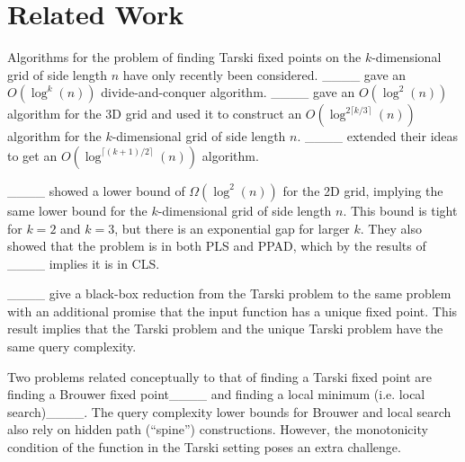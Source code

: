 \section{Related Work}
\label{sec:related_work}

Algorithms for the problem of finding Tarski fixed points on the $k$-dimensional grid of side length $n$ have only recently been considered. ____ gave an $O(\log^k (n))$ divide-and-conquer algorithm. ____ gave an $O(\log^2 (n))$ algorithm for the 3D grid and used it to construct an $O(\log^{2 \lceil k/3 \rceil} (n))$ algorithm for the $k$-dimensional grid of side length $n$. ____ extended their ideas to get an $O(\log^{\lceil (k+1)/2 \rceil}(n))$ algorithm.

 ____ showed a lower bound of $\Omega(\log^2(n))$ for the 2D grid, implying the same lower bound for the $k$-dimensional grid of side length $n$. This bound is tight for $k = 2$ and $k=3$, but there is an exponential gap for larger $k$. They also showed that the problem is in both PLS and PPAD, which by the results of ____ implies it is in CLS.

____ give a black-box reduction from the Tarski problem to the same problem with an additional promise that the input function has a unique fixed point. This result  implies that the Tarski problem and the unique Tarski problem have the same query complexity.

Two problems related conceptually to that of finding a Tarski fixed point are finding a Brouwer fixed point____ and finding a local minimum (i.e. local search)____. The query complexity lower bounds for Brouwer and local search also rely on hidden path (``spine'') constructions. However, the monotonicity condition of the function in the Tarski setting poses an extra challenge.